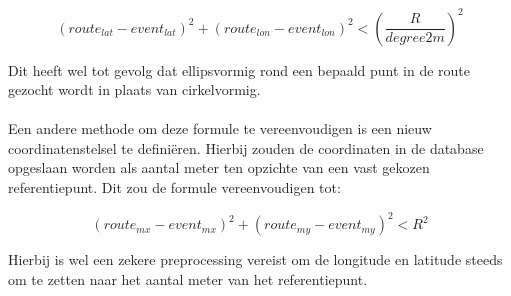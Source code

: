\documentclass[11pt,twoside,a4paper]{article}
\begin{document}
	\begin{equation}
	(route_{lat} - event_{lat})^{2} +(route_{lon} - event_{lon})^{2} < (\frac{R}{degree2m})^{2}
	\end{equation}
	
	Dit heeft wel tot gevolg dat ellipsvormig rond een bepaald punt in de route gezocht wordt in plaats van cirkelvormig.
	
	\paragraph{}
	Een andere methode om deze formule te vereenvoudigen is een nieuw coordinatenstelsel te defini\"eren. Hierbij zouden de coordinaten in de database opgeslaan worden als aantal meter ten opzichte van een vast gekozen referentiepunt. Dit zou de formule vereenvoudigen tot:
	
	\begin{equation}
	(route_{mx} - event_{mx})^{2} +(route_{my} - event_{my})^{2} < R^{2}
	\end{equation}
	
	Hierbij is wel een zekere preprocessing vereist om de longitude en latitude steeds om te zetten naar het aantal meter van het referentiepunt.	
	
\end{document}
